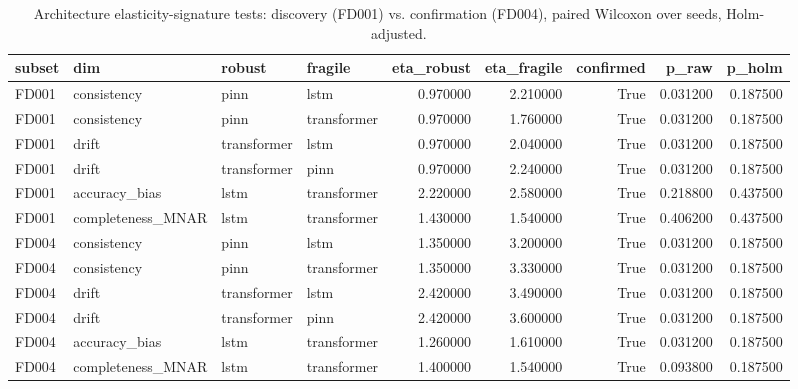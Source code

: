 \begin{table}
\caption{Architecture elasticity-signature tests: discovery (FD001) vs. confirmation (FD004), paired Wilcoxon over seeds, Holm-adjusted.}
\label{tab:E_signatures}
\begin{tabular}{llllrrrrr}
\toprule
subset & dim & robust & fragile & eta_robust & eta_fragile & confirmed & p_raw & p_holm \\
\midrule
FD001 & consistency & pinn & lstm & 0.970000 & 2.210000 & True & 0.031200 & 0.187500 \\
FD001 & consistency & pinn & transformer & 0.970000 & 1.760000 & True & 0.031200 & 0.187500 \\
FD001 & drift & transformer & lstm & 0.970000 & 2.040000 & True & 0.031200 & 0.187500 \\
FD001 & drift & transformer & pinn & 0.970000 & 2.240000 & True & 0.031200 & 0.187500 \\
FD001 & accuracy\_bias & lstm & transformer & 2.220000 & 2.580000 & True & 0.218800 & 0.437500 \\
FD001 & completeness\_MNAR & lstm & transformer & 1.430000 & 1.540000 & True & 0.406200 & 0.437500 \\
FD004 & consistency & pinn & lstm & 1.350000 & 3.200000 & True & 0.031200 & 0.187500 \\
FD004 & consistency & pinn & transformer & 1.350000 & 3.330000 & True & 0.031200 & 0.187500 \\
FD004 & drift & transformer & lstm & 2.420000 & 3.490000 & True & 0.031200 & 0.187500 \\
FD004 & drift & transformer & pinn & 2.420000 & 3.600000 & True & 0.031200 & 0.187500 \\
FD004 & accuracy\_bias & lstm & transformer & 1.260000 & 1.610000 & True & 0.031200 & 0.187500 \\
FD004 & completeness\_MNAR & lstm & transformer & 1.400000 & 1.540000 & True & 0.093800 & 0.187500 \\
\bottomrule
\end{tabular}
\end{table}
